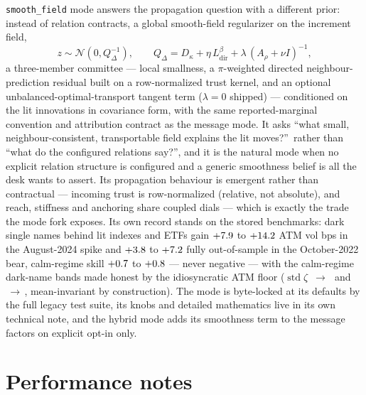 \documentclass[11pt]{article}
\newcommand{\Qdel}{Q_{\Delta}}
\newcommand{\Ldir}{L_{\mathrm{dir}}}
\begin{document}
\texttt{smooth\_field} mode answers the propagation question with a
different prior: instead of relation contracts, a global
smooth-field regularizer on the increment field,
\[
z\sim\mathcal N(0,\Qdel^{-1}),
\qquad
\Qdel=D_\kappa+\eta\,\Ldir^{\beta}+\lambda\,(A_\rho+\nu I)^{-1},
\]
a three-member committee --- local smallness, a $\pi$-weighted directed
neighbour-prediction residual built on a row-normalized trust kernel,
and an optional unbalanced-optimal-transport tangent term
($\lambda=0$ shipped) --- conditioned on the lit innovations in
covariance form, with the same reported-marginal convention and
attribution contract as the message mode.  It asks ``what small,
neighbour-consistent, transportable field explains the lit moves?''\
rather than ``what do the configured relations say?'', and it is the
natural mode when no explicit relation structure is configured and a
generic smoothness belief is all the desk wants to assert.  Its
propagation behaviour is emergent rather than contractual --- incoming
trust is row-normalized (relative, not absolute), and reach, stiffness
and anchoring share coupled dials --- which is exactly the trade the
mode fork exposes.  Its own record stands on the stored benchmarks:
dark single names behind lit indexes and ETFs gain
$+7.9$ to $+14.2$ ATM vol bps in the
August-2024 spike and $+3.8$ to $+7.2$ fully
out-of-sample in the October-2022 bear, calm-regime skill
$+0.7$ to $+0.8$ --- never negative --- with the
calm-regime dark-name bands made honest by the idiosyncratic ATM
floor ($\operatorname{std}\zeta$
\gmidiobefore$\,\to\,$\gmidioafter\ and
\gmidiobeforetwo$\,\to\,$\gmidioaftertwo, mean-invariant by
construction).  The mode is byte-locked at its defaults by the full
legacy test suite, its knobs and detailed mathematics live in its own
technical note, and the hybrid mode adds its smoothness term to the
message factors on explicit opt-in only.

\section{Performance notes}
\label{app:perf}
\end{document}
